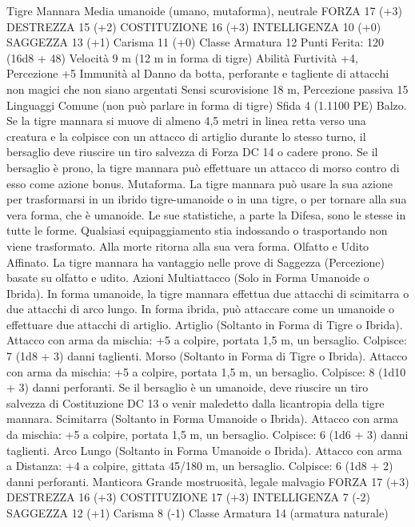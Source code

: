 \begin{multicols}{2}
Tigre Mannara
Media umanoide (umano, mutaforma), neutrale
FORZA 17 (+3)
DESTREZZA 15 (+2)
COSTITUZIONE 16 (+3)
INTELLIGENZA 10 (+0)
SAGGEZZA 13 (+1)
Carisma 11 (+0)
Classe Armatura 12
\hspace*{0pt}\hfill{Punti Ferita}: 120 (16d8 + 48)
Velocità 9 m (12 m in forma di tigre)
Abilità Furtività +4, Percezione +5
Immunità al Danno da botta, perforante e tagliente di
attacchi non magici che non siano argentati
Sensi scurovisione 18 m, Percezione passiva 15
Linguaggi Comune (non può parlare in forma di tigre)
Sfida 4 (1.1100 PE)
Balzo. Se la tigre mannara si muove di almeno 4,5 metri in linea
retta verso una creatura e la colpisce con un attacco di artiglio
durante lo stesso turno, il bersaglio deve riuscire un tiro salvezza
di Forza DC 14 o cadere prono. Se il bersaglio è prono, la tigre
mannara può effettuare un attacco di morso contro di esso come
azione bonus.
Mutaforma. La tigre mannara può usare la sua azione per
trasformarsi in un ibrido tigre-umanoide o in una tigre, o per
tornare alla sua vera forma, che è umanoide. Le sue statistiche, a
parte la Difesa, sono le stesse in tutte le forme. Qualsiasi
equipaggiamento stia indossando o trasportando non viene
trasformato. Alla morte ritorna alla sua vera forma.
Olfatto e Udito Affinato. La tigre mannara ha vantaggio nelle
prove di Saggezza (Percezione) basate su olfatto e udito.
Azioni
Multiattacco (Solo in Forma Umanoide o Ibrida). In forma
umanoide, la tigre mannara effettua due attacchi di scimitarra o
due attacchi di arco lungo. In forma ibrida, può attaccare come
un umanoide o effettuare due attacchi di artiglio.
Artiglio (Soltanto in Forma di Tigre o Ibrida). Attacco con
arma da mischia: +5 a colpire, portata 1,5 m, un bersaglio.
Colpisce: 7 (1d8 + 3) danni taglienti.
Morso (Soltanto in Forma di Tigre o Ibrida). Attacco con arma
da mischia: +5 a colpire, portata 1,5 m, un bersaglio.
Colpisce: 8 (1d10 + 3) danni perforanti. Se il bersaglio è un
umanoide, deve riuscire un tiro salvezza di Costituzione DC 13 o
venir maledetto dalla licantropia della tigre mannara.
Scimitarra (Soltanto in Forma Umanoide o Ibrida). Attacco
con arma da mischia: +5 a colpire, portata 1,5 m, un bersaglio.
Colpisce: 6 (1d6 + 3) danni taglienti.
Arco Lungo (Soltanto in Forma Umanoide o Ibrida). Attacco
con arma a Distanza: +4 a colpire, gittata 45/180 m, un
bersaglio.
Colpisce: 6 (1d8 + 2) danni perforanti.
Manticora
Grande mostruosità, legale malvagio
FORZA 17 (+3)
DESTREZZA 16 (+3)
COSTITUZIONE 17 (+3)
INTELLIGENZA 7 (-2)
SAGGEZZA 12 (+1)
Carisma 8 (-1)
Classe Armatura 14 (armatura naturale)

\end{multicols}
